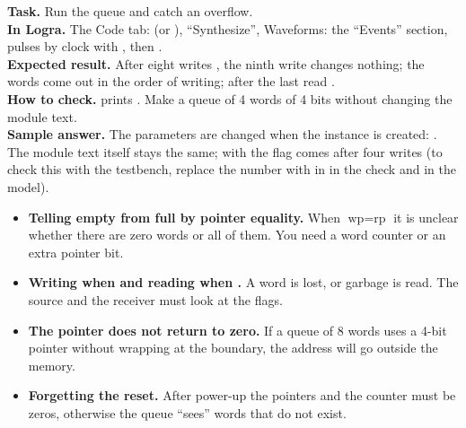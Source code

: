 \begin{diybox}
\textbf{Task.} Run the queue and catch an overflow.\\
\textbf{In Logra.} The Code tab:  (or ),
``Synthesize'', Waveforms: the ``Events'' section,  pulses by clock
with , then .\\
\textbf{Expected result.} After eight writes , the ninth write
changes nothing; the words come out in the order of writing; after the last
read .\\
\textbf{How to check.}  prints .
 Make a queue of 4 words of 4 bits without changing the module text.\\
\textbf{Sample answer.} The parameters are changed when the instance is created:
. The module text itself
stays the same; with  the flag  comes after four writes
(to check this with the testbench, replace the number  with  in
 in the check and in the model).
\end{diybox}


\begin{warnbox}
\begin{itemize}
  \item \textbf{Telling empty from full by pointer equality.} When
        $\text{wp}=\text{rp}$ it is unclear whether there are zero words or
        all of them. You need a word counter or an extra pointer bit.
  \item \textbf{Writing when  and reading when .} A word
        is lost, or garbage is read. The source and the receiver must look at
        the flags.
  \item \textbf{The pointer does not return to zero.} If a queue of 8 words
        uses a 4-bit pointer without wrapping at the boundary, the address
        will go outside the memory.
  \item \textbf{Forgetting the reset.} After power-up the pointers and the
        counter must be zeros, otherwise the queue ``sees'' words that do not
        exist.
\end{itemize}
\end{warnbox}

